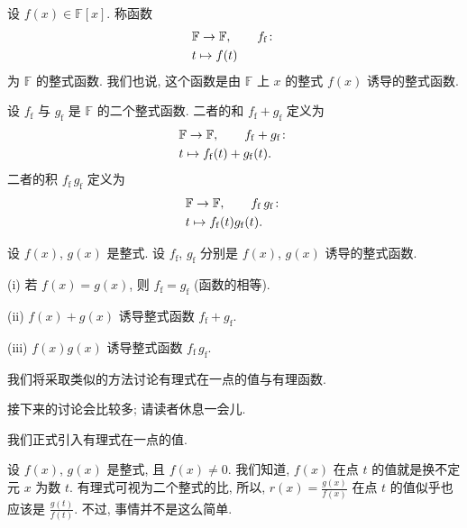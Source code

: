 \begin{definition}
    设 $f(x) \in \mathbb{F}[x]$. 称函数
    \begin{align*}
         & \mathbb{F} \to \mathbb{F}, \tag*{$f_\mathrm{f} \colon$} \\
         & t \mapsto f(t)
    \end{align*}
    为 $\mathbb{F}$ 的整式函数. 我们也说, 这个函数是由 $\mathbb{F}$ 上 $x$ 的整式 $f(x)$ 诱导的整式函数.
\end{definition}

\begin{definition}
    设 $f_\mathrm{f}$ 与 $g_\mathrm{f}$ 是 $\mathbb{F}$ 的二个整式函数. 二者的和 $f_\mathrm{f} + g_\mathrm{f}$ 定义为
    \begin{align*}
         & \mathbb{F} \to \mathbb{F}, \tag*{$f_\mathrm{f} + g_\mathrm{f} \colon$} \\
         & t \mapsto f_\mathrm{f} (t) + g_\mathrm{f} (t).
    \end{align*}
    二者的积 $f_\mathrm{f} \, g_\mathrm{f}$ 定义为
    \begin{align*}
         & \mathbb{F} \to \mathbb{F}, \tag*{$f_\mathrm{f} \, g_\mathrm{f} \colon$} \\
         & t \mapsto f_\mathrm{f} (t) g_\mathrm{f} (t).
    \end{align*}
\end{definition}

\begin{proposition}
    设 $f(x)$, $g(x)$ 是整式. 设 $f_\mathrm{f}$, $g_\mathrm{f}$ 分别是 $f(x)$, $g(x)$ 诱导的整式函数.

    (i) 若 $f(x) = g(x)$, 则 $f_\mathrm{f} = g_\mathrm{f}$ (函数的相等).

    (ii) $f(x) + g(x)$ 诱导整式函数 $f_\mathrm{f} + g_\mathrm{f}$.

    (iii) $f(x) g(x)$ 诱导整式函数 $f_\mathrm{f} \, g_\mathrm{f}$.
\end{proposition}

我们将采取类似的方法讨论有理式在一点的值与有理函数.

接下来的讨论会比较多; 请读者休息一会{\scriptsize 儿}.

\myLine

我们正式引入有理式在一点的值.

设 $f(x)$, $g(x)$ 是整式, 且 $f(x) \neq 0$. 我们知道, $f(x)$ 在点 $t$ 的值就是换不定元 $x$ 为数 $t$. 有理式可视为二个整式的比, 所以, $r(x) = \frac{g(x)}{f(x)}$ 在点 $t$ 的值似乎也应该是 $\frac{g(t)}{f(t)}$. 不过, 事情并不是这么简单.

